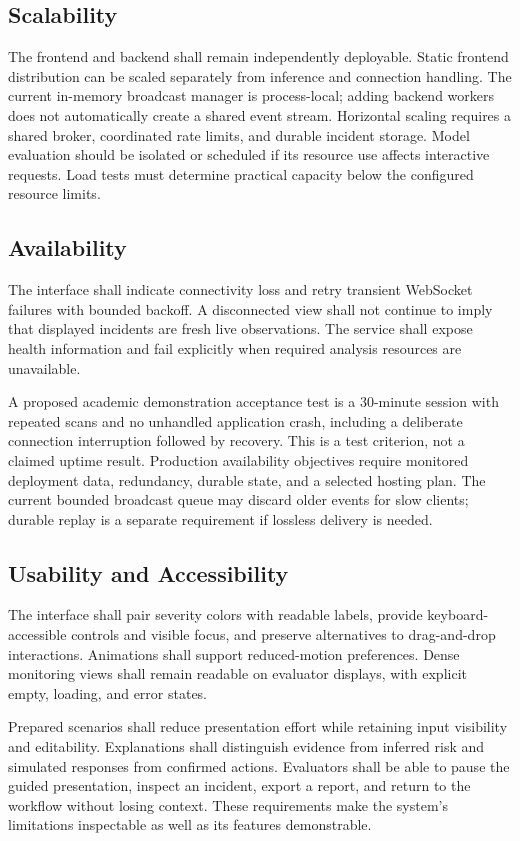 \documentclass[12pt,a4paper,oneside]{report}
\begin{document}
\subsection{Scalability}

The frontend and backend shall remain independently deployable. Static frontend distribution can be scaled separately from inference and connection handling. The current in-memory broadcast manager is process-local; adding backend workers does not automatically create a shared event stream. Horizontal scaling requires a shared broker, coordinated rate limits, and durable incident storage. Model evaluation should be isolated or scheduled if its resource use affects interactive requests. Load tests must determine practical capacity below the configured resource limits.

\subsection{Availability}

The interface shall indicate connectivity loss and retry transient WebSocket failures with bounded backoff. A disconnected view shall not continue to imply that displayed incidents are fresh live observations. The service shall expose health information and fail explicitly when required analysis resources are unavailable.

A proposed academic demonstration acceptance test is a 30-minute session with repeated scans and no unhandled application crash, including a deliberate connection interruption followed by recovery. This is a test criterion, not a claimed uptime result. Production availability objectives require monitored deployment data, redundancy, durable state, and a selected hosting plan. The current bounded broadcast queue may discard older events for slow clients; durable replay is a separate requirement if lossless delivery is needed.

\subsection{Usability and Accessibility}

The interface shall pair severity colors with readable labels, provide keyboard-accessible controls and visible focus, and preserve alternatives to drag-and-drop interactions. Animations shall support reduced-motion preferences. Dense monitoring views shall remain readable on evaluator displays, with explicit empty, loading, and error states.

Prepared scenarios shall reduce presentation effort while retaining input visibility and editability. Explanations shall distinguish evidence from inferred risk and simulated responses from confirmed actions. Evaluators shall be able to pause the guided presentation, inspect an incident, export a report, and return to the workflow without losing context. These requirements make the system's limitations inspectable as well as its features demonstrable.
\end{document}
